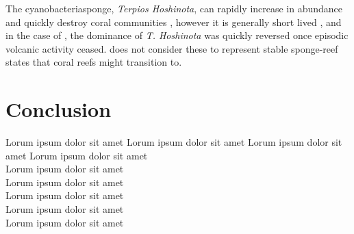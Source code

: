 \documentclass[11pt,a4paper]{article}
\begin{document}
 The cyanobacteriasponge, \textit{Terpios Hoshinota}, can rapidly increase in abundance and quickly destroy coral communities \citep{Schils2012,Elliott2016}, however it is generally short lived \citep{Reimer2010}, and in the case of \cite{Schils2012}, the dominance of \textit{T. Hoshinota} was quickly reversed once episodic volcanic activity ceased. \cite{Bell2013} does not consider these to represent stable sponge-reef states that coral reefs might transition to.


 
 
 

\section{Conclusion}
 Lorum ipsum dolor sit amet
  Lorum ipsum dolor sit amet
   Lorum ipsum dolor sit amet
    Lorum ipsum dolor sit amet\\
     Lorum ipsum dolor sit amet\\
      Lorum ipsum dolor sit amet\\
       Lorum ipsum dolor sit amet\\
        Lorum ipsum dolor sit amet\\
         Lorum ipsum dolor sit amet


\end{document}
